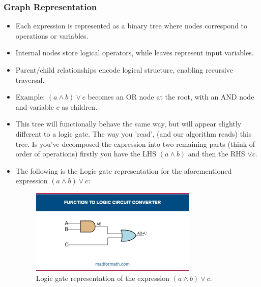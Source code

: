 \documentclass[11pt]{diazessay} %
\begin{document}
\subsubsection*{Graph Representation}
\begin{itemize}
    \item Each expression is represented as a binary tree where nodes correspond 
    to operations or variables.
    \item Internal nodes store logical operators, while leaves represent input variables.
    \item Parent/child relationships encode logical structure, enabling recursive traversal.
    \item Example: $(a \wedge b) \vee c$ becomes an OR node at the root, with an 
    AND node and variable $c$ as children.
    
\begin{center} %
\end{center}
	\item This tree will functionally behave the same way, but will appear slightly different to a logic gate. The way you 'read', (and our algorithm reads) this tree. Is you've decomposed the expression into two remaining parts (think of order of operations) firstly you have the LHS $(a \wedge b)$ and then the RHS $\vee c$.
	\item The following is the Logic gate representation for the aforementioned expression $(a \wedge b) \vee c$:
	\begin{figure}[h] %
    \centering
    \includegraphics[width=0.75\textwidth]{LogicGate}
    \caption{Logic gate representation of the expression $(a \wedge b) \vee c$.}
    \label{fig:logic_gate}
\end{figure}


\end{itemize}
\end{document}
